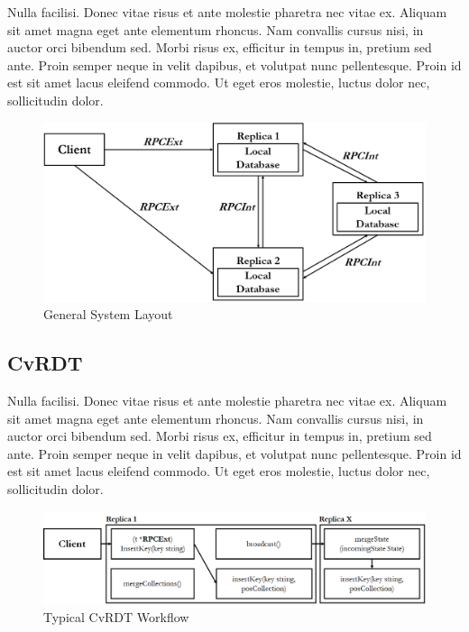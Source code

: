 \documentclass[sigconf,nonacm]{acmart}
\begin{document}
Nulla facilisi. Donec vitae risus et ante molestie pharetra nec vitae ex. Aliquam sit amet magna eget ante elementum rhoncus. Nam convallis cursus nisi, in auctor orci bibendum sed. Morbi risus ex, efficitur in tempus in, pretium sed ante. Proin semper neque in velit dapibus, et volutpat nunc pellentesque. Proin id est sit amet lacus eleifend commodo. Ut eget eros molestie, luctus dolor nec, sollicitudin dolor.

\begin{figure}[h]
  \centering
  \includegraphics[width=\linewidth]{Fig1Sys}
  \caption{General System Layout}
  \label{fig:sys}
\end{figure}

\subsection{CvRDT}

Nulla facilisi. Donec vitae risus et ante molestie pharetra nec vitae ex. Aliquam sit amet magna eget ante elementum rhoncus. Nam convallis cursus nisi, in auctor orci bibendum sed. Morbi risus ex, efficitur in tempus in, pretium sed ante. Proin semper neque in velit dapibus, et volutpat nunc pellentesque. Proin id est sit amet lacus eleifend commodo. Ut eget eros molestie, luctus dolor nec, sollicitudin dolor.

\begin{figure}[h]
  \centering
  \includegraphics[width=15cm]{Fig2CvRDT1}
  \caption{Typical CvRDT Workflow}
  \label{fig:cvrdt1}
\end{figure}
\end{document}
